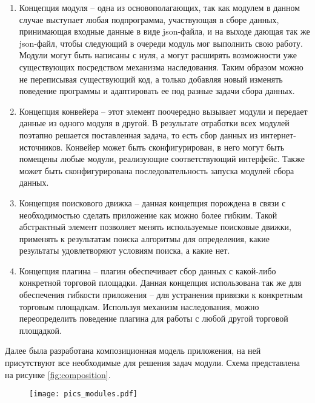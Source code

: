 \documentclass[../main]{subfiles}
\begin{document}
\begin{enumerate}
    \item Концепция модуля -- одна из основополагающих, так как модулем в данном случае выступает любая подпрограмма, участвующая в сборе данных, принимающая входные данные в виде json-файла, и на выходе дающая так же json-файл, чтобы следующий в очереди модуль мог выполнить свою работу. Модули могут быть написаны с нуля, а могут расширять возможности уже существующих посредством механизма наследования. Таким образом можно не переписывая существующий код, а только добавляя новый изменять поведение программы и адаптировать ее под разные задачи сбора данных.
    \item Концепция конвейера -- этот элемент поочередно вызывает модули и передает данные из одного модуля в другой. В результате отработки всех модулей поэтапно решается поставленная задача, то есть сбор данных из интернет-источников. Конвейер может быть сконфигурирован, в него могут быть помещены любые модули, реализующие соответствующий интерфейс. Также может быть сконфигурирована последовательность запуска модулей сбора данных.
    \item Концепция поискового движка -- данная концепция порождена в связи с необходимостью сделать приложение как можно более гибким. Такой абстрактный элемент позволяет менять используемые поисковые движки, применять к результатам поиска алгоритмы для определения, какие результаты удовлетворяют условиям поиска, а какие нет.
    \item Концепция плагина -- плагин обеспечивает сбор данных с какой-либо конкретной торговой площадки. Данная концепция использована так же для обеспечения гибкости приложения -- для устранения привязки к конкретным торговым площадкам. Используя механизм наследования, можно переопределить поведение плагина для работы с любой другой торговой площадкой. 
\end{enumerate}

Далее была разработана композиционная модель приложения, на ней присутствуют все необходимые для решения задач модули. Схема представлена на рисунке \ref{fig:composition}.

\begin{figure}[H]
    \centering
    {\texttt{[image: pics\_modules.pdf]}}
    \vspace{-\baselineskip}
\end{figure}
\end{document}
